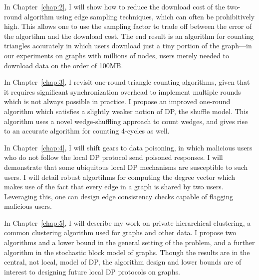 \documentclass[12pt]{ucsddissertation}
\begin{document}
\begin{dissertationintroduction}
In Chapter~\ref{chap:2}, I will show how to reduce the download cost of the two-round algorithm
using edge sampling techniques, which can often be prohibitively high. This allows one to use the 
sampling factor to trade off between the error of the algortihm and the download cost. The end 
result is an algorithm for counting triangles accurately in which users download just a tiny 
portion of the graph---in our experiments on graphs with millions of nodes, users merely
needed to download data on the order of 100MB.

In Chapter~\ref{chap:3}, I revisit one-round triangle counting algorithms, given that it requires significant 
synchronization overhead to implement multiple rounds which is not always possible in practice. 
I propose an improved one-round algorithm which satisfies a slightly weaker
notion of DP, the shuffle model. This algorithm uses a novel wedge-shuffling approach
to count wedges, and gives rise to an accurate algorithm for counting 
4-cycles as well. 

In Chapter~\ref{chap:4}, I will shift gears to data poisoning, in which
malicious users who do not follow the local DP protocol send poisoned responses. 
I will demonstrate that some ubiquitous local DP mechanisms are susceptible to such users.
I will detail robust algortihms for computing the degree vector which
makes use of the fact that every edge in a graph is shared by two users. Leveraging this, one 
can design edge consistency checks capable of flagging malicious users.

In Chapter~\ref{chap:5}, I will describe my work on private hierarchical clustering,
a common clustering algorithm used for graphs and other data. I propose two algorithms and 
a lower bound in the general setting of the problem, and a further algorithm in the stochastic 
block model of graphs. Though the results are in the central, not local, model of DP, the algorithm 
design and lower bounds are of interest to designing future local DP protocols on graphs.

\end{dissertationintroduction}







\appendix






\backmatter

\end{document}
